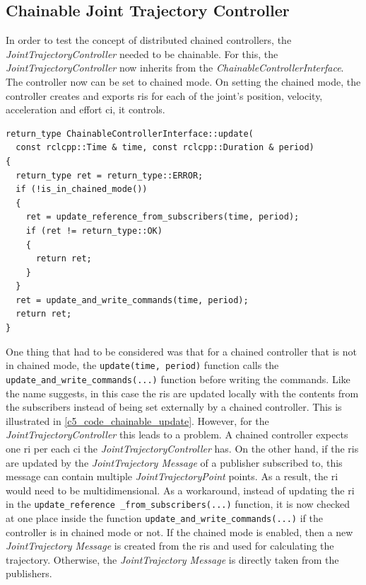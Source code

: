 \subsection{Chainable Joint Trajectory Controller}
In order to test the concept of distributed chained controllers, the \textit{JointTrajectoryController} needed to be chainable. For this, the \textit{JointTrajectoryController} now inherits from the \textit{ChainableControllerInterface}. The controller now can be set to chained mode. On setting the chained mode, the controller creates and exports \glspl{ri} for each of the joint's position, velocity, acceleration and effort \gls{ci}, it controls.\newline
\lstset{language=C++,basicstyle=\small}
\begin{lstlisting}[caption=Update function for \textit{ChainableControllerInterface}.,label=c5_code_chainable_update]
return_type ChainableControllerInterface::update(
  const rclcpp::Time & time, const rclcpp::Duration & period)
{
  return_type ret = return_type::ERROR;
  if (!is_in_chained_mode())
  {
    ret = update_reference_from_subscribers(time, period);
    if (ret != return_type::OK)
    {
      return ret;
    }
  }
  ret = update_and_write_commands(time, period);
  return ret;
}
\end{lstlisting}
One thing that had to be considered was that for a chained controller that is not in chained mode, the \lstset{language=C++,basicstyle=\small\ttfamily}\lstinline{update(time, period)} function calls the \lstset{language=C++,basicstyle=\small\ttfamily}\lstinline{update_and_write_commands(...)} function before writing the commands. Like the name suggests, in this case the \glspl{ri} are updated locally with the contents from the subscribers instead of being set externally by a chained controller. This is illustrated in \autoref{c5_code_chainable_update}. However, for the \textit{JointTrajectoryController} this leads to a problem. A chained controller expects one \gls{ri} per each \gls{ci} the \textit{JointTrajectoryController} has. On the other hand, if the \glspl{ri} are updated by the \textit{JointTrajectory Message} of a publisher subscribed to, this message can contain multiple \textit{JointTrajectoryPoint} points. As a result, the \gls{ri} would need to be multidimensional. \newline
As a workaround, instead of updating the \gls{ri} in the \lstset{language=C++,basicstyle=\small\ttfamily, breaklines=true}\lstinline{update_reference _from_subscribers(...)} function, it is now checked at one place inside the function \lstset{language=C++,basicstyle=\small\ttfamily}\lstinline{update_and_write_commands(...)} if the controller is in chained mode or not. If the chained mode is enabled, then a new \textit{JointTrajectory Message} is created from the \glspl{ri} and used for calculating the trajectory. Otherwise, the \textit{JointTrajectory Message} is directly taken from the publishers.

